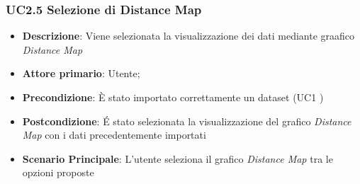 \subsubsection{UC2.5 Selezione di Distance Map}
\label{ssub:UC2.5}
\begin{itemize}
	\item \textbf{Descrizione}:			Viene selezionata la visualizzazione dei dati mediante graafico \emph{Distance Map}
	\item \textbf{Attore primario}:		Utente;
	\item \textbf{Precondizione}:		È stato importato correttamente un dataset (UC1 )
	\item \textbf{Postcondizione}:		É stato selezionata la visualizzazione del grafico \emph{Distance Map} con i dati 
										precedentemente importati
	
	\item \textbf{Scenario Principale}: L'utente seleziona il grafico \emph{Distance Map} tra le opzioni proposte
\end{itemize}
